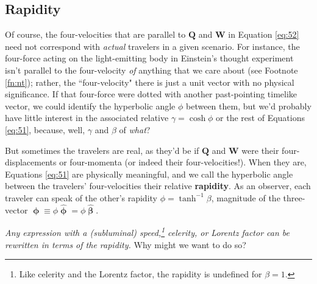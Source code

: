 \documentclass[12pt]{article}
\renewcommand{\vv}[1]{\mathbf{#1}}
\newcommand{\hatbeta}{\bm{\hat{\upbeta}}}
\newcommand{\vvphi}{\bm{\upphi}}
\newcommand{\hatphi}{\bm{\hat{\upphi}}}
\begin{document}
\subsection{Rapidity}

Of course, the four-velocities that are parallel to $\vv Q$ and $\vv W$ in Equation \ref{eq:52} need not correspond with \emph{actual} travelers in a given scenario. For instance, the four-force acting on the light-emitting body in Einstein's thought experiment isn't parallel to the four-velocity \emph{of} anything that we care about (see Footnote \ref{fn:nt}); rather, the ``four-velocity" there is just a unit vector with no physical significance. If that four-force were dotted with another past-pointing timelike vector, we could identify the hyperbolic angle $\phi$ between them, but we'd probably have little interest in the associated relative $\gamma = \cosh{\phi}$ or the rest of Equations \ref{eq:51}, because, well, $\gamma$ and $\beta$ of \emph{what}?

But sometimes the travelers are real, as they'd be if $\vv Q$ and $\vv W$ were their four-displacements or four-momenta (or indeed their four-velocities!). When they are, Equations \ref{eq:51} are physically meaningful, and we call the hyperbolic angle between the travelers' four-velocities their relative \textbf{rapidity}. As an observer, each traveler can speak of the other's rapidity $\phi = \tanh^{-1}{\beta}$, magnitude of the three-vector $\vvphi \equiv \phi \hatphi = \phi \hatbeta$.

\emph{Any expression with a (subluminal) speed,\footnote{Like celerity and the Lorentz factor, the rapidity is undefined for $\beta = 1$.} celerity, or Lorentz factor can be rewritten in terms of the rapidity.} Why might we want to do so?
\end{document}
